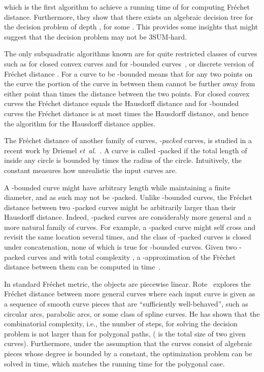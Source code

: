 \documentclass[12pt]{dalthesis}
\newcommand{\etal}{{\em et~al.\/}}
\newcommand{\Frechet}{Fr\'echet }
\begin{document}
which is the first algorithm to achieve 
a running time of  for computing \Frechet distance.
Furthermore, they 
show that there exists an algebraic decision tree 
for the decision problem of depth , 
for some . This 
provides some insights that might suggest
that the decision problem may not be 3SUM-hard.


The only subquadratic algorithms known are for
quite restricted classes of curves such as 
for closed convex curves and for -bounded curves~\cite{Alt2003Comparison}, 
or discrete version of \Frechet distance \cite{DiscreteSUBQuadractic}. 
For a curve to be -bounded means that for any two points on the curve
the portion of the curve in between them cannot be further away from either point than 
times the distance between the two points.  For closed convex curves the \Frechet distance
equals the Hausdorff distance and for -bounded curves the \Frechet distance is at most
 times the Hausdorff distance, and hence the  algorithm for the Hausdorff
distance applies.

The \Frechet distance of another family of curves, {\em -packed} curves, 
is studied in a recent work by Driemel \etal~\cite{c-packedFD}.
A curve  is called -packed if the total length of  inside any 
circle is bounded by  times the radius of the circle. Intuitively, the constant 
measures how unrealistic the input curves are.


A -bounded curve might have arbitrary length while maintaining a finite diameter, 
and as such may not be -packed.
Unlike -bounded curves, the \Frechet
distance between two -packed curves might be arbitrarily 
larger than their Hausdorff distance. Indeed, -packed
curves are considerably more general and a more natural
family of curves. For example, a -packed curve might self cross and revisit the same location
several times, and the class of -packed curves is closed under concatenation, 
none of which is true for -bounded curves. Given two -packed curves  and 
with total complexity , a -approximation of the \Frechet distance between them 
can be computed in  time~\cite{c-packedFD}.

In standard \Frechet metric, the objects are piecewise linear.
Rote~\cite{smoothFD} explores the \Frechet distance between more general curves where
each input curve is given as a sequence of smooth curve pieces that are “sufficiently well-behaved”, 
such as circular arcs, parabolic arcs, or some class of spline curves. 
He has shown that the combinatorial complexity, i.e., the number of steps, for solving the decision
 problem is not larger than for polygonal paths,  ( is the total size of two given curves). 
Furthermore, under the assumption that the curves consist of algebraic pieces whose degree is bounded by a constant, 
the optimization problem can be solved in  time, which matches the running time for the polygonal case. 
\end{document}
